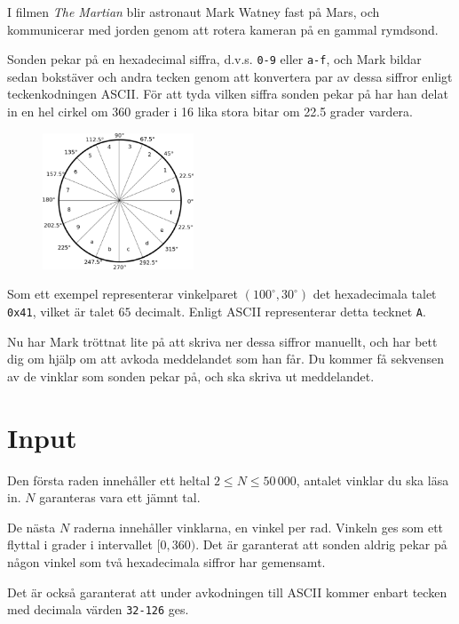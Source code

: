 
I filmen \emph{The Martian} blir astronaut Mark Watney fast på Mars, och kommunicerar med jorden genom att rotera
kameran på en gammal rymdsond.

Sonden pekar på en hexadecimal siffra, d.v.s. \texttt{0-9} eller \texttt{a-f}, och Mark bildar sedan bokstäver
och andra tecken genom att konvertera par av dessa siffror enligt teckenkodningen ASCII. För att tyda
vilken siffra sonden pekar på har han delat in en hel cirkel om 360 grader i 16 lika stora bitar om 22.5 grader
vardera.

\begin{figure}[h!]
  \begin{center}
    \includegraphics[width=0.4\textwidth]{angles.eps}
  \end{center}
\end{figure}

Som ett exempel representerar vinkelparet $(100^{\circ}, 30^{\circ})$ det hexadecimala talet \texttt{0x41}, vilket är talet $65$ decimalt.
Enligt ASCII representerar detta tecknet \texttt{A}.

Nu har Mark tröttnat lite på att skriva ner dessa siffror manuellt, och har bett dig om hjälp om att avkoda meddelandet
som han får. Du kommer få sekvensen av de vinklar som sonden pekar på, och ska skriva ut meddelandet.

\section*{Input}
Den första raden innehåller ett heltal $2 \le N \le 50\,000$, antalet vinklar du ska läsa in. $N$ garanteras vara ett jämnt tal.

De nästa $N$ raderna innehåller vinklarna, en vinkel per rad. Vinkeln ges som ett flyttal i grader i intervallet $[0, 360)$.
Det är garanterat att sonden aldrig pekar på någon vinkel som två hexadecimala siffror har gemensamt.

Det är också garanterat att under avkodningen till ASCII kommer enbart tecken med decimala värden \texttt{32-126} ges.

